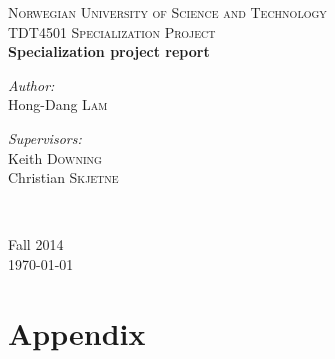 \documentclass[12pt, a4paper]{article}
\begin{document}
\begin{titlepage}



\textsc{\LARGE Norwegian University of Science and Technology}\\[1.5cm]

\textsc{\Large TDT4501 Specialization Project}\\[0.5cm]


{ \huge \bfseries Specialization project report \\[0.4cm] }


\noindent
\begin{minipage}{0.4\textwidth}
\begin{flushleft} \large
\emph{Author:}\\
Hong-Dang \textsc{Lam}
\end{flushleft}
\end{minipage}%
\begin{minipage}{0.4\textwidth}
\begin{flushright} \large
\emph{Supervisors:} \\
Keith \textsc{Downing}\\
Christian \textsc{Skjetne}
\end{flushright}
\end{minipage}\\

\vfill

{Fall 2014\\\large \today}

\end{titlepage}




\newpage
\begin{abstract}

\end{abstract}

\newpage
\tableofcontents
\newpage
\listoffigures
\newpage
\listoftables
\newpage
{}






\nocite{*}


\newpage
\section{Appendix}
\label{sec:app}
\appendix

	
	
\end{document}
